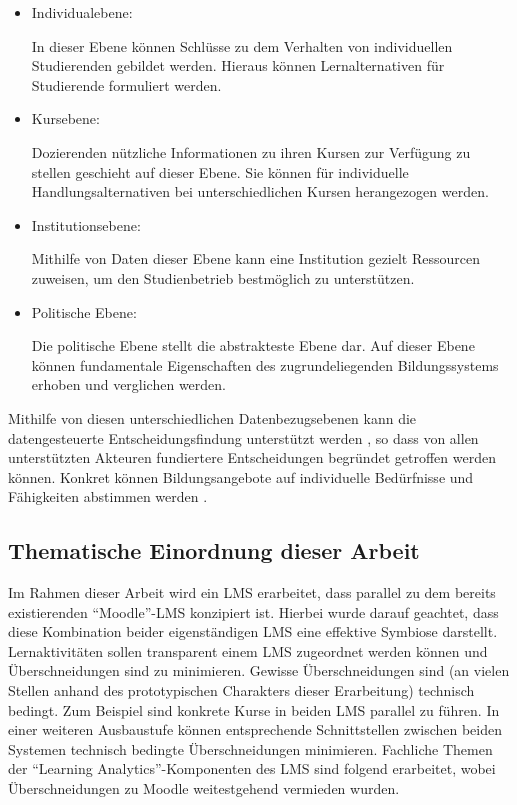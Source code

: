 \begin{itemize}
	\item Individualebene: 
	
		In dieser Ebene können Schlüsse zu dem Verhalten von individuellen Studierenden gebildet werden. Hieraus können Lernalternativen für Studierende formuliert werden.
		
	\item Kursebene:
	
		Dozierenden nützliche Informationen zu ihren Kursen zur Verfügung zu stellen geschieht auf dieser Ebene. Sie können für individuelle Handlungsalternativen bei unterschiedlichen Kursen herangezogen werden. 
	
	\item Institutionsebene:
	
		Mithilfe von Daten dieser Ebene kann eine Institution gezielt Ressourcen zuweisen, um den Studienbetrieb bestmöglich zu unterstützen.  
	
	\item Politische Ebene:
	
		Die politische Ebene stellt die abstrakteste Ebene dar. Auf dieser Ebene können fundamentale Eigenschaften des zugrundeliegenden Bildungssystems erhoben und verglichen werden.
	
\end{itemize}

Mithilfe von diesen unterschiedlichen Datenbezugsebenen kann die datengesteuerte Entscheidungsfindung unterstützt werden \autocite[S.19]{theEvolutionOfBigDataAndLearningAnalyticsInAmericanHigherEducation}, so dass von allen unterstützten Akteuren fundiertere Entscheidungen begründet getroffen werden können. Konkret können Bildungsangebote auf individuelle Bedürfnisse und Fähigkeiten abstimmen werden \autocite[S.26]{2012HorizonReport}.






\subsection{Thematische Einordnung dieser Arbeit}


Im Rahmen dieser Arbeit wird ein \ac{LMS} erarbeitet, dass parallel zu dem bereits existierenden \enquote{Moodle}-\ac{LMS} konzipiert ist. Hierbei wurde darauf geachtet, dass diese Kombination beider eigenständigen \ac{LMS} eine effektive Symbiose darstellt. Lernaktivitäten sollen transparent einem \ac{LMS} zugeordnet werden können und Überschneidungen sind zu minimieren. Gewisse Überschneidungen sind (an vielen Stellen anhand des prototypischen Charakters dieser Erarbeitung) technisch bedingt. Zum Beispiel sind konkrete Kurse in beiden \ac{LMS} parallel zu führen. In einer weiteren Ausbaustufe können entsprechende Schnittstellen zwischen beiden Systemen technisch bedingte Überschneidungen minimieren. Fachliche Themen der \enquote{Learning Analytics}-Komponenten des \ac{LMS} sind folgend erarbeitet, wobei Überschneidungen zu Moodle weitestgehend vermieden wurden. 

